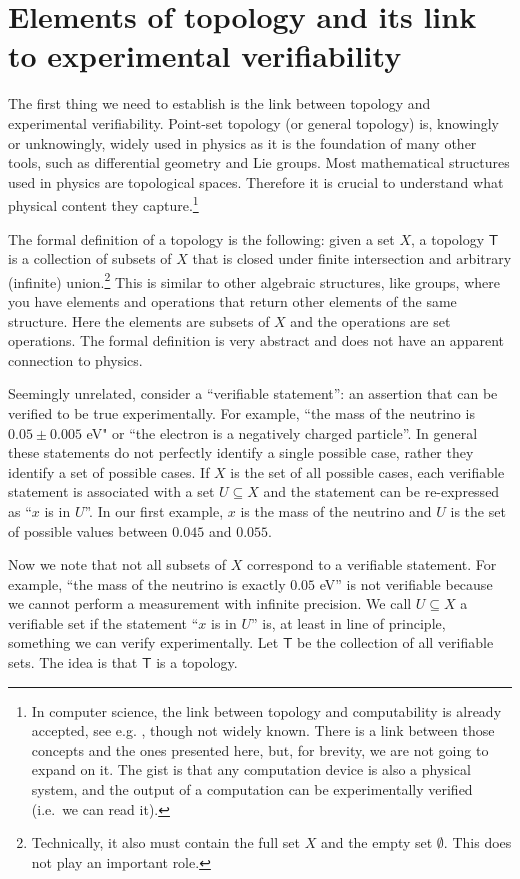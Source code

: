 \documentclass[12pt]{iopart}
\begin{document}
\section{Elements of topology and its link to experimental verifiability}

The first thing we need to establish is the link between topology and experimental verifiability. Point-set topology (or general topology) is, knowingly or unknowingly, widely used in physics as it is the foundation of many other tools, such as differential geometry and Lie groups. Most mathematical structures used in physics are topological spaces. Therefore it is crucial to understand what physical content they capture.\footnote{In computer science, the link between topology and computability is already accepted, see e.g. \cite{escardo2004synthetic}, though not widely known. There is a link between those concepts and the ones presented here, but, for brevity, we are not going to expand on it. The gist is that any computation device is also a physical system, and the output of a computation can be experimentally verified (i.e.~we can read it).}

The formal definition of a topology is the following: given a set $X$, a topology $\mathsf{T}$ is a collection of subsets of $X$ that is closed under finite intersection and arbitrary (infinite) union.\footnote{Technically, it also must contain the full set $X$ and the empty set $\emptyset$. This does not play an important role.} This is similar to other algebraic structures, like groups, where you have elements and operations that return other elements of the same structure. Here the elements are subsets of $X$ and the operations are set operations. The formal definition is very abstract and does not have an apparent connection to physics.

Seemingly unrelated, consider a ``verifiable statement'': an assertion that can be verified to be true experimentally. For example, ``the mass of the neutrino is $0.05 \pm 0.005$ eV" or ``the electron is a negatively charged particle''. In general these statements do not perfectly identify a single possible case, rather they identify a set of possible cases. If $X$ is the set of all possible cases, each verifiable statement is associated with a set $U \subseteq X$ and the statement can be re-expressed as ``$x$ is in $U$''. In our first example, $x$ is the mass of the neutrino and $U$ is the set of possible values between $0.045$ and $0.055$.

Now we note that not all subsets of $X$ correspond to a verifiable statement. For example, ``the mass of the neutrino is exactly $0.05$ eV'' is not verifiable because we cannot perform a measurement with infinite precision. We call $U \subseteq X$ a verifiable set if the statement ``$x$ is in $U$'' is, at least in line of principle, something we can verify experimentally. Let $\mathsf{T}$ be the collection of all verifiable sets. The idea is that $\mathsf{T}$ is a topology.
\end{document}
